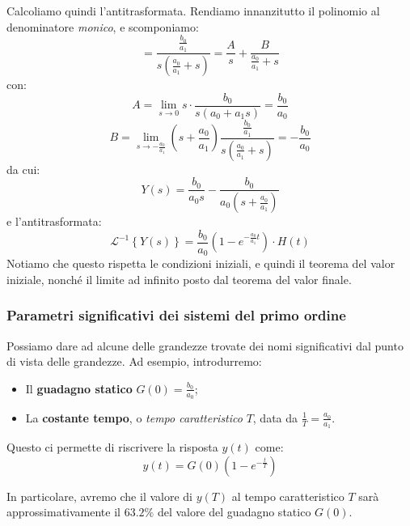 \documentclass[a4paper,11pt]{article}
\begin{document}
Calcoliamo quindi l'antitrasformata.
Rendiamo innanzitutto il polinomio al denominatore \textit{monico}, e scomponiamo:
$$
= \frac{\frac{b_0}{a_1}}{s \left( \frac{a_0}{a_1} + s \right)} = \frac{A}{s} + \frac{B}{\frac{a_0}{a_1} + s}
$$
con:
$$
A = \lim_{s \rightarrow 0} s \cdot \frac{b_0}{s(a_0 + a_1 s)} = \frac{b_0}{a_0}
$$
$$
B = \lim_{s \rightarrow -\frac{a_0}{a_1}} \left( s + \frac{a_0}{a_1} \right)  \frac{\frac{b_0}{a_1}}{s \left( \frac{a_0}{a_1} + s \right)} = -\frac{b_0}{a_0}
$$
da cui:
$$
Y(s) = \frac{b_0}{a_0 s} - \frac{b_0}{a_0 \left( s + \frac{a_0}{a_1} \right)}
$$
e l'antitrasformata:
$$
\mathcal{L}^{-1} \left\{ Y(s) \right\} = \frac{b_0}{a_0} \left( 1 - e^{-\frac{a_0}{a_1}t} \right) \cdot H(t)
$$
Notiamo che questo rispetta le condizioni iniziali, e quindi il teorema del valor iniziale, nonché il limite ad infinito posto dal teorema del valor finale.

\subsubsection{Parametri significativi dei sistemi del primo ordine}
Possiamo dare ad alcune delle grandezze trovate dei nomi significativi dal punto di vista delle grandezze.
Ad esempio, introdurremo:
\begin{itemize}
	\item Il \textbf{guadagno statico} $G(0) = \frac{b_0}{a_0}$;
	\item La \textbf{costante tempo}, o \textit{tempo caratteristico} $T$, data da $\frac{1}{T} = \frac{a_0}{a_1}$.
\end{itemize}

Questo ci permette di riscrivere la risposta $y(t)$ come:
$$
y(t) = G(0) \left( 1 - e^{-\frac{t}{T}} \right)
$$

In particolare, avremo che il valore di $y(T)$ al tempo caratteristico $T$ sarà approssimativamente il $63.2 \%$ del valore del guadagno statico $G(0)$.
\end{document}
